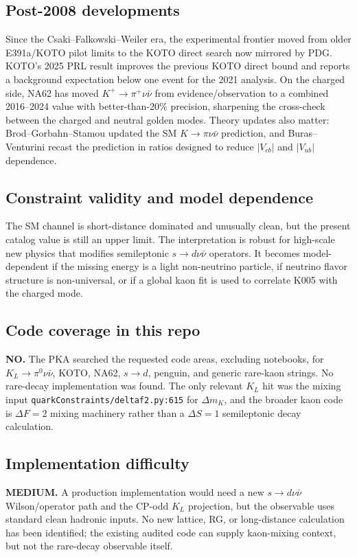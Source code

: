 \subsection*{Post-2008 developments}
Since the Csaki--Falkowski--Weiler era, the experimental frontier moved from
older E391a/KOTO pilot limits to the KOTO direct search now mirrored by PDG.
KOTO's 2025 PRL result improves the previous KOTO direct bound and reports a
background expectation below one event for the 2021 analysis.  On the charged
side, NA62 has moved \(K^+\to\pi^+\nu\bar\nu\) from evidence/observation to a
combined 2016--2024 value with better-than-\(20\%\) precision, sharpening the
cross-check between the charged and neutral golden modes.  Theory updates also
matter: Brod--Gorbahn--Stamou updated the SM \(K\to\pi\nu\bar\nu\) prediction,
and Buras--Venturini recast the prediction in ratios designed to reduce
\(|V_{cb}|\) and \(|V_{ub}|\) dependence.

\subsection*{Constraint validity and model dependence}
The SM channel is short-distance dominated and unusually clean, but the
present catalog value is still an upper limit.  The interpretation is robust
for high-scale new physics that modifies semileptonic \(s\to d\nu\bar\nu\)
operators.  It becomes model-dependent if the missing energy is a light
non-neutrino particle, if neutrino flavor structure is non-universal, or if a
global kaon fit is used to correlate K005 with the charged mode.

\subsection*{Code coverage in this repo}
\textbf{NO.}  The PKA searched the requested code areas, excluding
notebooks, for \(K_L\to\pi^0\nu\bar\nu\), KOTO, NA62, \(s\to d\), penguin,
and generic rare-kaon strings.  No rare-decay implementation was found.  The
only relevant \(K_L\) hit was the mixing input
\texttt{quarkConstraints/deltaf2.py:615} for \(\Delta m_K\), and the broader
kaon code is \(\Delta F=2\) mixing machinery rather than a \(\Delta S=1\)
semileptonic decay calculation.

\subsection*{Implementation difficulty}
\textbf{MEDIUM.}  A production implementation would need a new
\(s\to d\nu\bar\nu\) Wilson/operator path and the CP-odd \(K_L\) projection,
but the observable uses standard clean hadronic inputs.  No new lattice, RG, or
long-distance calculation has been identified; the existing audited code can
supply kaon-mixing context, but not the rare-decay observable itself.

